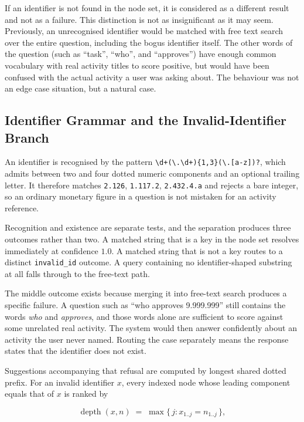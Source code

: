 If an identifier is not found in the node set, it is considered as a different result and not as a failure. This distinction is not as insignificant as it may seem. Previously, an unrecognised identifier would be matched with free text search over the entire question, including the bogus identifier itself. The other words of the question (such as ``task'', ``who'', and ``approves'') have enough common vocabulary with real activity titles to score positive, but would have been confused with the actual activity a user was asking about. The behaviour was not an edge case situation, but a natural case.

\subsection{Identifier Grammar and the Invalid-Identifier Branch}
\label{sec:idgrammar}

An identifier is recognised by the pattern
\texttt{\textbackslash d+(\textbackslash.\textbackslash d+)\{1,3\}(\textbackslash.[a-z])?},
which admits between two and four dotted numeric components and an optional trailing letter.
It therefore matches \texttt{2.126}, \texttt{1.117.2}, \texttt{2.432.4.a} and rejects a bare
integer, so an ordinary monetary figure in a question is not mistaken for an activity
reference.

Recognition and existence are separate tests, and the separation produces three outcomes
rather than two. A matched string that is a key in the node set resolves immediately at
confidence $1.0$. A matched string that is not a key routes to a distinct
\texttt{invalid\_id} outcome. A query containing no identifier-shaped substring at all falls
through to the free-text path.

The middle outcome exists because merging it into free-text search produces a specific
failure. A question such as ``who approves 9.999.999'' still contains the words
\emph{who} and \emph{approves}, and those words alone are sufficient to score against some
unrelated real activity. The system would then answer confidently about an activity the user
never named. Routing the case separately means the response states that the identifier does
not exist.

Suggestions accompanying that refusal are computed by longest shared dotted prefix. For an
invalid identifier $x$, every indexed node whose leading component equals that of $x$ is
ranked by

\[
\operatorname{depth}(x, n) \;=\; \max \{\, j : x_{1..j} = n_{1..j} \,\},
\]

